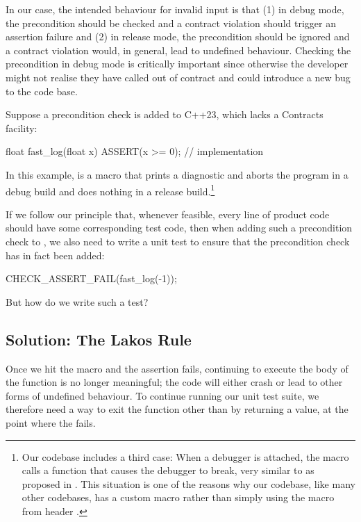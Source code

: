 In our case, the intended behaviour for invalid input is that (1) in debug mode, the precondition  should be checked and a contract violation should trigger an assertion failure and (2) in release mode, the precondition should be ignored and a contract violation would, in general, lead to undefined behaviour. Checking the precondition in debug mode is critically important since otherwise the developer might not realise they have called  out of contract and could introduce a new bug to the code base.

Suppose a precondition check is added to C++23, which lacks a Contracts facility:
\begin{codeblock}
float fast_log(float x) {
  ASSERT(x >= 0);
  // implementation
}
\end{codeblock}
In this example,  is a macro that prints a diagnostic and aborts the program in a debug build and does nothing in a release build.\footnote{Our codebase includes a third case: When a debugger is attached, the macro calls a function that causes the debugger to break, very similar to  as proposed in \cite{P2514R0}. This situation is one of the reasons why our codebase, like many other codebases, has a custom  macro rather than simply using the  macro from header .}

If we follow our principle that, whenever feasible, every line of product code should have some corresponding test code, then when adding such a precondition check to , we also need to write a unit test to ensure that the precondition check has in fact been added:
\begin{codeblock}
CHECK_ASSERT_FAIL(fast_log(-1));
\end{codeblock}
But how do we write such a test?

\subsection{Solution: The Lakos Rule}
Once we hit the  macro and the assertion fails, continuing to execute the body of the function is no longer meaningful; the code will either crash or lead to other forms of undefined behaviour. To continue running our unit test suite, we therefore need a way to exit the function other than by returning a value, at the point where the  fails. 

